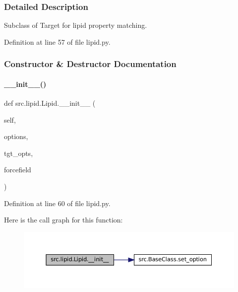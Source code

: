 \subsubsection{Detailed Description}
Subclass of Target for lipid property matching. 



Definition at line 57 of file lipid.\+py.



\subsubsection{Constructor \& Destructor Documentation}
\mbox{\label{classsrc_1_1lipid_1_1Lipid_a3ee96b07d26ea757f06f2b51fd8f68c8}} 
\paragraph{\texorpdfstring{\+\_\+\+\_\+init\+\_\+\+\_\+()}{\_\_init\_\_()}}
{\footnotesize\ttfamily def src.\+lipid.\+Lipid.\+\_\+\+\_\+init\+\_\+\+\_\+ (\begin{DoxyParamCaption}\item[{}]{self,  }\item[{}]{options,  }\item[{}]{tgt\+\_\+opts,  }\item[{}]{forcefield }\end{DoxyParamCaption})}



Definition at line 60 of file lipid.\+py.

Here is the call graph for this function\+:
\nopagebreak
\begin{figure}[H]
\begin{center}
\leavevmode
\includegraphics[width=350pt]{classsrc_1_1lipid_1_1Lipid_a3ee96b07d26ea757f06f2b51fd8f68c8_cgraph}
\end{center}
\end{figure}


